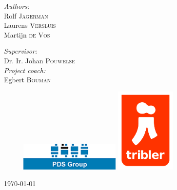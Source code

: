 \begin{titlepage}
\begin{center}
\begin{minipage}{0.4\textwidth}
\begin{flushleft} \large
\emph{Authors:}\\
Rolf \textsc{Jagerman} \\ [0.1cm]
Laurens \textsc{Versluis} \\ [0.1cm]
Martijn \textsc{de Vos} \\ [0.1cm]
\end{flushleft}
\end{minipage}
\begin{minipage}{0.4\textwidth}
\begin{flushright} \large
\emph{Supervisor:} \\
Dr. Ir. Johan \textsc{Pouwelse}\\
\emph{Project coach:} \\
Egbert \textsc{Bouman}
\end{flushright}
\end{minipage}
\vspace{30mm}
\begin{figure}[ht!]
\centering
\includegraphics[width=50mm]{graphics/pdslogo.png}
\hspace{10mm}
\includegraphics[width=30mm]{graphics/triblerlogo.png}
\label{overflow}
\end{figure}
\vfill

{\large \today}

\end{center}

\end{titlepage}